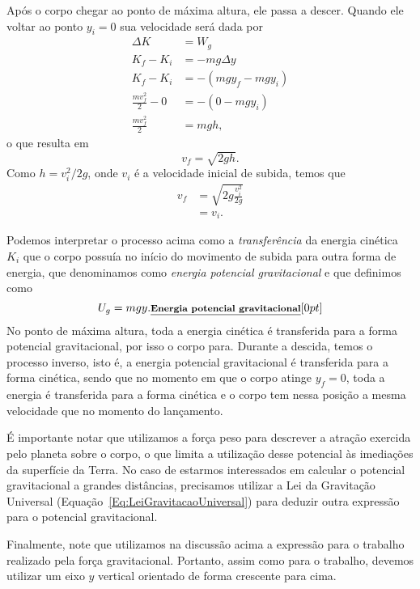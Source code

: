 Após o corpo chegar ao ponto de máxima altura, ele passa a descer. Quando ele voltar ao ponto $y_i = 0$ sua velocidade será dada por
\begin{align}
  \Delta K &= W_g \\
  K_f - K_i &=  -mg\Delta y \\
  K_f - K_i &=  -(mgy_f - mgy_i) \\
  \frac{mv_f^2}{2} - 0 &= -(0 - mgy_i) \\
  \frac{mv_f^2}{2} &= mgh,
\end{align}
%
o que resulta em
\begin{equation}
    v_f = \sqrt{2gh}.
\end{equation}
%
Como $h = v_i^2/2g$, onde $v_i$ é a velocidade inicial de subida, temos que
\begin{align}
    v_f &= \sqrt{2g\frac{v_i^2}{2g}} \\
    &= v_i.
\end{align}

Podemos interpretar o processo acima como a \emph{transferência} da energia cinética $K_i$ que o corpo possuía no início do movimento de subida para outra forma de energia, que denominamos como \emph{energia potencial gravitacional} e que definimos como
\begin{equation}
  U_g = mgy. \relax{\footnotesize\emph{\textbf{Energia potencial gravitacional}}}[0pt]
\end{equation}
%
No ponto de máxima altura, toda a energia cinética é transferida para a forma potencial gravitacional, por isso o corpo para. Durante a descida, temos o processo inverso, isto é, a energia potencial gravitacional é transferida para a forma cinética, sendo que no momento em que o corpo atinge $y_f = 0$, toda a energia é transferida para a forma cinética e o corpo tem nessa posição a mesma velocidade que no momento do lançamento.

É importante notar que utilizamos a força peso para descrever a atração exercida pelo planeta sobre o corpo, o que limita a utilização desse potencial às imediações da superfície da Terra. No caso de estarmos interessados em calcular o potencial gravitacional a grandes distâncias, precisamos utilizar a Lei da Gravitação Universal (Equação~\eqref{Eq:LeiGravitacaoUniversal}) para deduzir outra expressão para o potencial gravitacional.

Finalmente, note que utilizamos na discussão acima a expressão para o trabalho realizado pela força gravitacional. Portanto, assim como para o trabalho, devemos utilizar um eixo $y$ vertical orientado de forma crescente para cima. 

